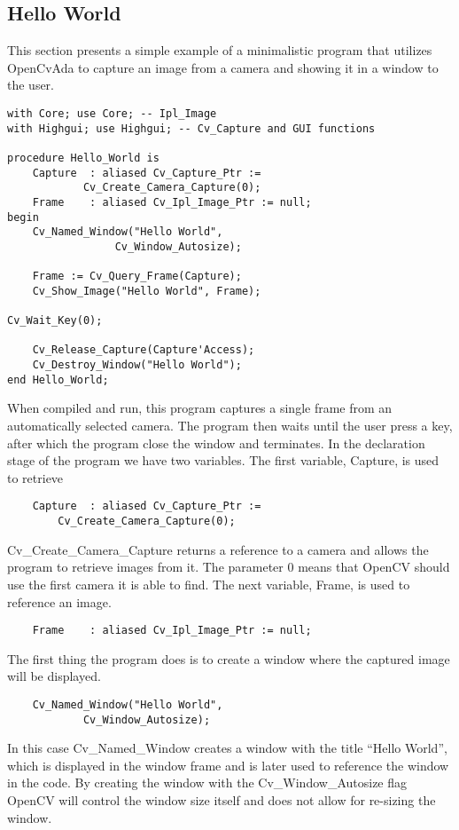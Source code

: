 \subsection{Hello World}
This section presents a simple example of a minimalistic program that utilizes OpenCvAda to capture an image from a camera and showing it in a window to the user. 
\begin{lstlisting}
with Core; use Core; -- Ipl_Image
with Highgui; use Highgui; -- Cv_Capture and GUI functions

procedure Hello_World is
	Capture  : aliased Cv_Capture_Ptr := 
			Cv_Create_Camera_Capture(0);
	Frame    : aliased Cv_Ipl_Image_Ptr := null;
begin
	Cv_Named_Window("Hello World", 
		         Cv_Window_Autosize);

	Frame := Cv_Query_Frame(Capture);
	Cv_Show_Image("Hello World", Frame);

Cv_Wait_Key(0);
		
	Cv_Release_Capture(Capture'Access);
	Cv_Destroy_Window("Hello World");
end Hello_World;
\end{lstlisting}
When compiled and run, this program captures a single frame from an automatically selected camera. The program then waits until the user press a key, after which the program close the window and terminates.
In the declaration stage of the program we have two variables. The first variable, Capture, is used to retrieve
\begin{lstlisting}
	Capture  : aliased Cv_Capture_Ptr := 
		Cv_Create_Camera_Capture(0);
\end{lstlisting} 
Cv_Create_Camera_Capture returns a reference to a camera and allows the program to retrieve images from it. The parameter 0 means that OpenCV should use the first camera it is able to find.
The next variable, Frame, is used to reference an image.
\begin{lstlisting}
	Frame    : aliased Cv_Ipl_Image_Ptr := null;
\end{lstlisting}
The first thing the program does is to create a window where the captured image will be displayed.
\begin{lstlisting}
	Cv_Named_Window("Hello World", 
			Cv_Window_Autosize);
\end{lstlisting}
In this case Cv_Named_Window creates a window with the title “Hello World”, which is displayed in the window frame and is later used to reference the window in the code. By creating the window with the Cv_Window_Autosize flag OpenCV will control the window size itself and does not allow for re-sizing the window.
